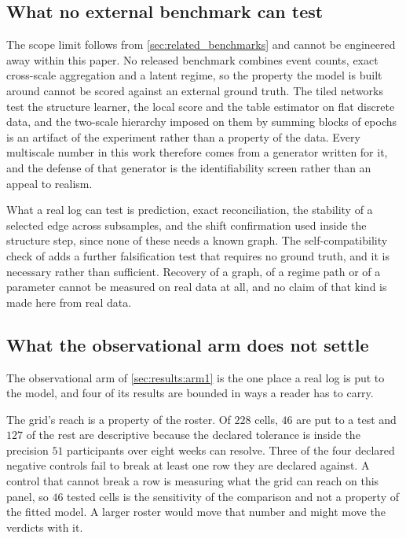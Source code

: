 \subsection{What no external benchmark can test}
\label{sec:lim_scope}

The scope limit follows from \cref{sec:related_benchmarks} and cannot be
engineered away within this paper. No released benchmark combines event counts,
exact cross-scale aggregation and a latent regime, so the property the model is
built around cannot be scored against an external ground truth. The tiled
networks test the structure learner, the local score and the table estimator on
flat discrete data, and the two-scale hierarchy imposed on them by summing blocks
of epochs is an artifact of the experiment rather than a property of the data.
Every multiscale number in this work therefore comes from a generator written for
it, and the defense of that generator is the identifiability screen rather than
an appeal to realism.

What a real log can test is prediction, exact reconciliation, the stability of a
selected edge across subsamples, and the shift confirmation used inside the
structure step, since none of these needs a known graph. The self-compatibility
check of \citet{faller2024selfcompatibility} adds a further falsification test
that requires no ground truth, and it is necessary rather than sufficient.
Recovery of a graph, of a regime path or of a parameter cannot be measured on
real data at all, and no claim of that kind is made here from real data.

\subsection{What the observational arm does not settle}
\label{sec:lim_arm1}

The observational arm of \cref{sec:results:arm1} is the one place a real log is
put to the model, and four of its results are bounded in ways a reader has to
carry.

The grid's reach is a property of the roster. Of $228$ cells, $46$ are put to a
test and $127$ of the rest are descriptive because the declared tolerance is
inside the precision $51$ participants over eight weeks can resolve. Three of
the four declared negative controls fail to break at least one row they are
declared against. A control that cannot break a row is measuring what the grid
can reach on this panel, so $46$ tested cells is the sensitivity of the
comparison and not a property of the fitted model. A larger roster would move
that number and might move the verdicts with it.

